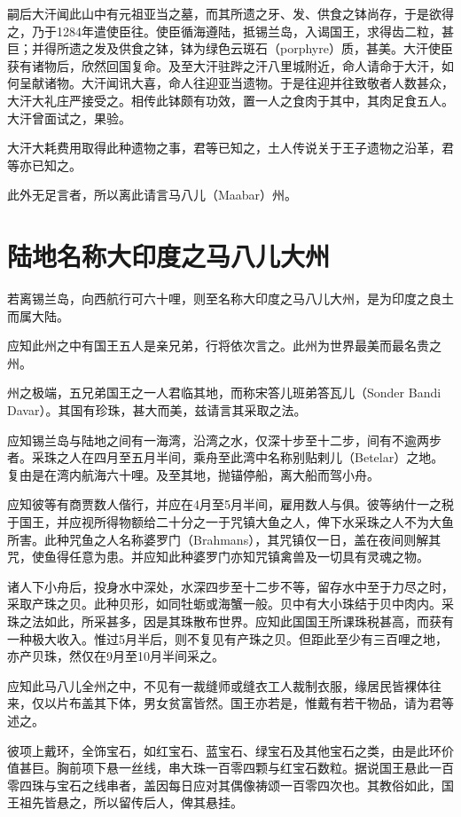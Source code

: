 \documentclass[12pt,UTF8]{ctexbook}
\begin{document}
嗣后大汗闻此山中有元祖亚当之墓，而其所遗之牙、发、供食之钵尚存，于是欲得之，乃于1284年遣使臣往。使臣循海遵陆，抵锡兰岛，入谒国王，求得齿二粒，甚巨；并得所遗之发及供食之钵，钵为绿色云斑石（porphyre）质，甚美。大汗使臣获有诸物后，欣然回国复命。及至大汗驻跸之汗八里城附近，命人请命于大汗，如何呈献诸物。大汗闻讯大喜，命人往迎亚当遗物。于是往迎并往致敬者人数甚众，大汗大礼庄严接受之。相传此钵颇有功效，置一人之食肉于其中，其肉足食五人。大汗曾面试之，果验。

大汗大耗费用取得此种遗物之事，君等已知之，土人传说关于王子遗物之沿革，君等亦已知之。

此外无足言者，所以离此请言马八儿（Maabar）州。





\chapter{陆地名称大印度之马八儿大州}

若离锡兰岛，向西航行可六十哩，则至名称大印度之马八儿大州，是为印度之良土而属大陆。

应知此州之中有国王五人是亲兄弟，行将依次言之。此州为世界最美而最名贵之州。

州之极端，五兄弟国王之一人君临其地，而称宋答儿班弟答瓦儿（Sonder Bandi Davar）。其国有珍珠，甚大而美，兹请言其采取之法。

应知锡兰岛与陆地之间有一海湾，沿湾之水，仅深十步至十二步，间有不逾两步者。采珠之人在四月至五月半间，乘舟至此湾中名称别贴剌儿（Betelar）之地。复由是在湾内航海六十哩。及至其地，抛锚停船，离大船而驾小舟。

应知彼等有商贾数人偕行，并应在4月至5月半间，雇用数人与俱。彼等纳什一之税于国王，并应视所得物额给二十分之一于咒镇大鱼之人，俾下水采珠之人不为大鱼所害。此种咒鱼之人名称婆罗门（Brahmans），其咒镇仅一日，盖在夜间则解其咒，使鱼得任意为患。并应知此种婆罗门亦知咒镇禽兽及一切具有灵魂之物。

诸人下小舟后，投身水中深处，水深四步至十二步不等，留存水中至于力尽之时，采取产珠之贝。此种贝形，如同牡蛎或海蟹一般。贝中有大小珠结于贝中肉内。采珠之法如此，所采甚多，因是其珠散布世界。应知此国国王所课珠税甚高，而获有一种极大收入。惟过5月半后，则不复见有产珠之贝。但距此至少有三百哩之地，亦产贝珠，然仅在9月至10月半间采之。

应知此马八儿全州之中，不见有一裁缝师或缝衣工人裁制衣服，缘居民皆裸体往来，仅以片布盖其下体，男女贫富皆然。国王亦若是，惟戴有若干物品，请为君等述之。

彼项上戴环，全饰宝石，如红宝石、蓝宝石、绿宝石及其他宝石之类，由是此环价值甚巨。胸前项下悬一丝线，串大珠一百零四颗与红宝石数粒。据说国王悬此一百零四珠与宝石之线串者，盖因每日应对其偶像祷颂一百零四次也。其教俗如此，国王祖先皆悬之，所以留传后人，俾其悬挂。
\end{document}
